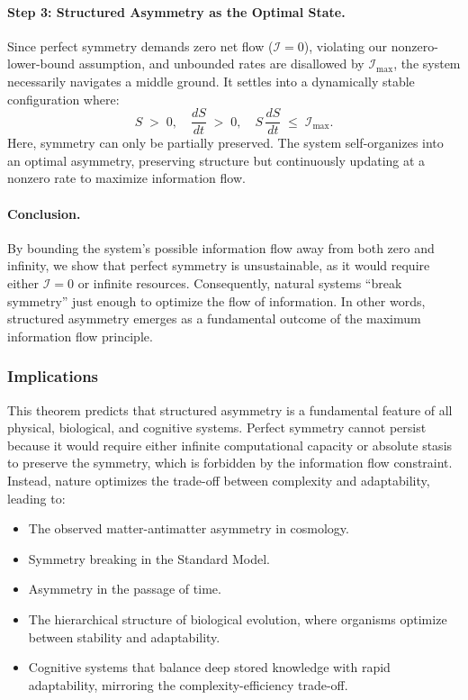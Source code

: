 \documentclass[12pt]{article}
\begin{document}
\paragraph{Step 3: Structured Asymmetry as the Optimal State.}
Since perfect symmetry demands zero net flow (\(\mathcal{I}=0\)), violating our nonzero-lower-bound assumption, and unbounded rates are disallowed by \(\mathcal{I}_{\max}\), the system necessarily navigates a middle ground. It settles into a dynamically stable configuration where:
\[
   S \;>\; 0,
   \quad
   \frac{dS}{dt} \;>\; 0,
   \quad
   S \,\frac{dS}{dt} \;\leq\; \mathcal{I}_{\max}.
\]
Here, symmetry can only be partially preserved. The system self-organizes into an optimal asymmetry, preserving structure but continuously updating at a nonzero rate to maximize information flow.

\paragraph{Conclusion.}
By bounding the system's possible information flow away from both zero and infinity, we show that perfect symmetry is unsustainable, as it would require either \(\mathcal{I}=0\) or infinite resources. Consequently, natural systems ``break symmetry'' just enough to optimize the flow of information. In other words, structured asymmetry emerges as a fundamental outcome of the maximum information flow principle.


\subsubsection{Implications}
This theorem predicts that structured asymmetry is a fundamental feature of all physical, biological, and cognitive systems. Perfect symmetry cannot persist because it would require either infinite computational capacity or absolute stasis to preserve the symmetry, which is forbidden by the information flow constraint. Instead, nature optimizes the trade-off between complexity and adaptability, leading to:

\begin{itemize}
    \item The observed matter-antimatter asymmetry in cosmology.
    \item Symmetry breaking in the Standard Model.
    \item Asymmetry in the passage of time.
    \item The hierarchical structure of biological evolution, where organisms optimize between stability and adaptability.
    \item Cognitive systems that balance deep stored knowledge with rapid adaptability, mirroring the complexity-efficiency trade-off.
\end{itemize}
\end{document}
